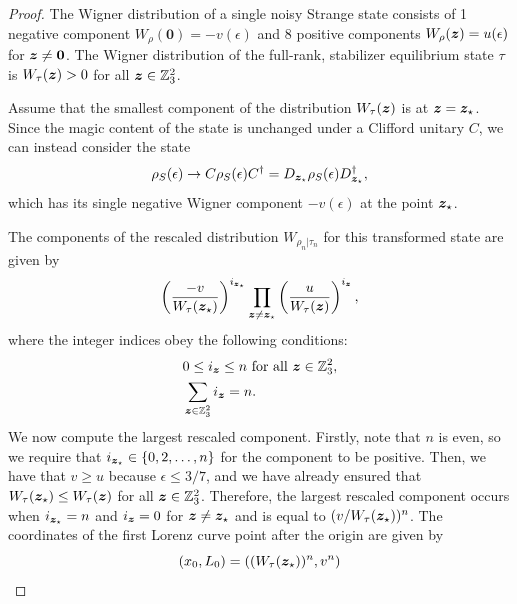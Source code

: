 \documentclass[pra,
aps,
twocolumn,
superscriptaddress,
groupedaddress,
nofootinbib,
reprint
]{revtex4-1}
\begin{document}
\begin{proof}
The Wigner distribution of a single noisy Strange state consists of 1 negative component $W_{\rho}(\mathbf{0}) = -v(\epsilon)$ and 8 positive components $W_{\rho}(\bm{z}) = u(\epsilon)$ for $\bm{z} \neq \bm{0}$.
The Wigner distribution of the full-rank, stabilizer equilibrium state $\tau$ is $W_{\tau}(\bm{z}) > 0$ for all $\bm{z} \in \mathbb{Z}_3^2$.

Assume that the smallest component of the distribution $W_\tau(\bm{z})$ is at $\bm{z}=\bm{z}_\star$. Since the magic content of the state is unchanged under a Clifford unitary $C$, we can instead consider the state
\begin{equation}
\rho_S(\epsilon) \rightarrow C \rho_S(\epsilon) C^\dagger = D_{\bm{z}_\star} \rho_S(\epsilon) D_{\bm{z}_\star}^\dagger,
\end{equation}
which has its single negative Wigner component $-v(\epsilon)$ at the point $\bm{z}_\star$.

The components of the rescaled distribution $W_{\rho_n|\tau_n}$ for this transformed state are given by
\begin{equation}
	\left(\frac{-v}{W_{\tau}(\bm{z}_\star)}\right)^{i_{\bm{z}_\star}} \prod_{\bm{z} \neq \bm{z}_\star} \left(\frac{u}{W_{\tau}(\bm{z})}\right)^{i_{\bm{z}}},
\end{equation}
where the integer indices obey the following conditions:
\begin{align}
&0 \leq i_{\bm{z}} \leq n \mbox{ for all } \bm{z} \in \mathbb{Z}_3^2, \nonumber \\
&\sum_{\bm{z} \in \mathbb{Z}_3^2} i_{\bm{z}} = n.
\end{align}
We now compute the largest rescaled component.
Firstly, note that $n$ is even, so we require that $i_{\bm{z}_\star} \in \{0,2,\dots,n\}$ for the component to be positive.
Then, we have that $v \geq u$ because $\epsilon \leq 3/7$, and we have already ensured that $W_{\tau}(\bm{z}_\star) \leq W_{\tau}(\bm{z})$ for all $\bm{z} \in \mathbb{Z}_3^2$.
Therefore, the largest rescaled component occurs when $i_{\bm{z}_{\star}} = n$ and $i_{\bm{z}} = 0$ for $\bm{z} \neq \bm{z}_\star$ and is equal to $(v/W_{\tau}(\bm{z}_\star))^n$.
The coordinates of the first Lorenz curve point after the origin are given by
\begin{equation}
	(x_0, L_0) = ((W_{\tau}(\bm{z}_\star))^n, v^n)
\end{equation}


\end{proof}
\end{document}
